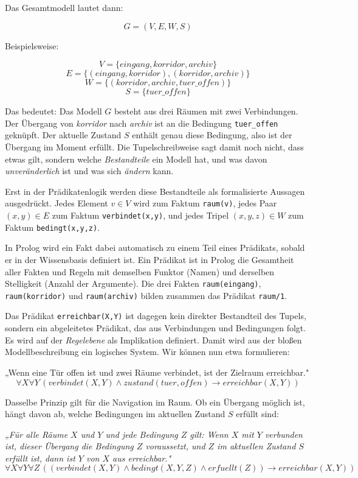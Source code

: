 \documentclass[parskip=half,a4paper,11pt]{scrreprt}
\begin{document}
Das Gesamtmodell lautet dann:

$$G=(V,E,W,S)$$

Beispielsweise:

$$V=\{eingang,korridor,archiv\}$$
$$E=\{(eingang,korridor),(korridor,archiv)\}$$
$$W=\{(korridor,archiv,tuer\_offen)\}$$
$$S=\{tuer\_offen\}$$

Das bedeutet: Das Modell $G$ besteht aus drei Räumen mit zwei Verbindungen. Der Übergang von \textit{korridor} nach \textit{archiv} ist an die Bedingung \texttt{tuer\_offen} geknüpft. Der aktuelle Zustand $S$ enthält genau diese Bedingung, also ist der Übergang im Moment erfüllt. Die Tupelschreibweise sagt damit noch nicht, dass etwas gilt, sondern welche \textit{Bestandteile} ein Modell hat, und was davon \textit{unveränderlich} ist und was sich \textit{ändern} kann.

Erst in der Prädikatenlogik werden diese Bestandteile als formalisierte Aussagen ausgedrückt. Jedes Element $v \in V$ wird zum Faktum \texttt{raum(v)}, jedes Paar $(x,y) \in E$ zum Faktum \texttt{verbindet(x,y)}, und jedes Tripel $(x,y,z) \in W$ zum Faktum \texttt{bedingt(x,y,z)}.

In Prolog wird ein Fakt dabei automatisch zu einem Teil eines Prädikats, sobald er in der Wissensbasis definiert ist. Ein Prädikat ist in Prolog die Gesamtheit aller Fakten und Regeln mit demselben Funktor (Namen) und derselben Stelligkeit (Anzahl der Argumente). Die drei Fakten \texttt{raum(eingang)}, \texttt{raum(korridor)} und \texttt{raum(archiv)} bilden zusammen das Prädikat \texttt{raum/1}.

Das Prädikat \texttt{erreichbar(X,Y)} ist dagegen kein direkter Bestandteil des Tupels, sondern ein abgeleitetes Prädikat, das aus Verbindungen und Bedingungen folgt. Es wird auf der \textit{Regelebene} als Implikation definiert. Damit wird aus der bloßen Modellbeschreibung ein logisches System. Wir können nun etwa formulieren:

„Wenn eine Tür offen ist und zwei Räume verbindet, ist der Zielraum erreichbar."
$$\forall X\forall Y\,(verbindet(X,Y) \land zustand(tuer, offen) \rightarrow erreichbar(X,Y))$$

Dasselbe Prinzip gilt für die Navigation im Raum. Ob ein Übergang möglich ist, hängt davon ab, welche Bedingungen im aktuellen Zustand $S$ erfüllt sind:

\textit{„Für alle Räume $X$ und $Y$ und jede Bedingung $Z$ gilt: Wenn $X$ mit $Y$ verbunden ist, dieser Übergang die Bedingung $Z$ voraussetzt, und $Z$ im aktuellen Zustand $S$ erfüllt ist, dann ist $Y$ von $X$ aus erreichbar."}
$$\forall X\forall Y\forall Z\,((verbindet(X,Y) \land bedingt(X,Y,Z) \land erfuellt(Z)) \rightarrow erreichbar(X,Y))$$
\end{document}
